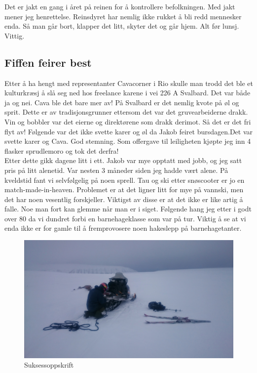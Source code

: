 Det er jakt en gang i året på reinen for å kontrollere befolkningen.
Med jakt mener jeg henrettelse. Reinsdyret har nemlig ikke rukket å
bli redd mennesker enda. Så man går bort, klapper det litt, skyter det
og går hjem. Alt før lunsj. Vittig.





\subsection*{Fiffen feirer best}

Etter å ha hengt med representanter Cavacorner i Rio skulle man trodd
det ble et kulturkræsj å slå seg ned hos freelance karene i vei 226 A
Svalbard. Det var både ja og nei. Cava ble det bare mer av! På
Svalbard er det nemlig kvote på øl og sprit. Dette er av
tradisjonsgrunner ettersom det var det gruvearbeiderne drakk. Vin og
bobbler var det eierne og direktørene som drakk derimot. Så det er det
fri flyt av! Følgende var det ikke svette karer og øl da Jakob feiret
bursdagen.Det var svette karer og Cava. God stemning. Som offergave
til leiligheten kjøpte jeg inn 4 flasker sprudlemoro og tok det
derfra!\\


Etter dette gikk dagene litt i ett. Jakob var mye opptatt med jobb, og
jeg satt pris på litt alenetid. Var nesten 3 måneder siden jeg hadde
vært alene. På kveldstid fant vi selvfølgelig på noen sprell. Tau og
ski etter snøscooter er jo en match-made-in-heaven. Problemet er at
det ligner litt for mye på vannski, men det har noen vesentlig
forskjeller. Viktigst av disse er at det  ikke er like
artig å falle. Noe man fort kan glemme når man er i siget. Følgende
hang jeg etter i godt over 80 da vi dundret forbi en
barnehageklasse som var på tur. Viktig å se at vi enda ikke er for
gamle til å fremprovosere noen hakeslepp på barnehagetanter.\\
\begin{figure}[]
	\centering
	\includegraphics[width=\textwidth]{Scooterogski}
	\caption*{Suksessoppskrift}
\label{fig:trollsteinen}
\end{figure}

